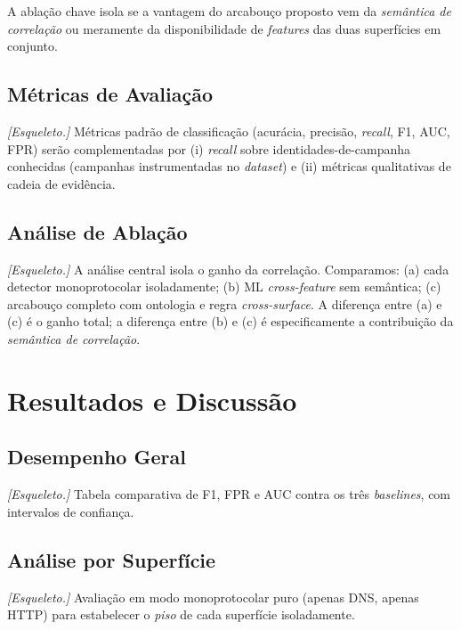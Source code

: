 \documentclass[preprint,12pt]{elsarticle}
\begin{document}
A ablação chave isola se a vantagem do arcabouço proposto vem da \emph{semântica de correlação} ou meramente da disponibilidade de \emph{features} das duas superfícies em conjunto.

\subsection{Métricas de Avaliação}

\textit{[Esqueleto.]} Métricas padrão de classificação (acurácia, precisão, \emph{recall}, F1, AUC, FPR) serão complementadas por (i) \emph{recall} sobre identidades-de-campanha conhecidas (campanhas instrumentadas no \emph{dataset}) e (ii) métricas qualitativas de cadeia de evidência.

\subsection{Análise de Ablação}

\textit{[Esqueleto.]} A análise central isola o ganho da correlação. Comparamos: (a) cada detector monoprotocolar isoladamente; (b) ML \emph{cross-feature} sem semântica; (c) arcabouço completo com ontologia e regra \emph{cross-surface}. A diferença entre (a) e (c) é o ganho total; a diferença entre (b) e (c) é especificamente a contribuição da \emph{semântica de correlação}.


\section{Resultados e Discussão}
\label{sec:results}

\subsection{Desempenho Geral}

\textit{[Esqueleto.]} Tabela comparativa de F1, FPR e AUC contra os três \emph{baselines}, com intervalos de confiança.

\subsection{Análise por Superfície}

\textit{[Esqueleto.]} Avaliação em modo monoprotocolar puro (apenas DNS, apenas HTTP) para estabelecer o \emph{piso} de cada superfície isoladamente.
\end{document}
